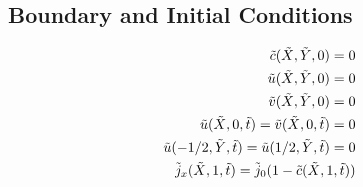 \documentclass[../main.tex]{subfiles}
\begin{document}
\subsection{Boundary and Initial Conditions}
\begin{center}
    \begin{align}
        \tilde{c}(\tilde{X}, \tilde{Y}, 0) = 0 \\
        \tilde{u}(\tilde{X}, \tilde{Y}, 0) = 0 \\
        \tilde{v}(\tilde{X}, \tilde{Y}, 0) = 0 \\
        \tilde{u}(\tilde{X}, 0, \tilde{t}) = \tilde{v}(\tilde{X}, 0, \tilde{t}) = 0 \\
        \tilde{u}(-1/2, \tilde{Y}, \tilde{t}) =  \tilde{u}(1/2, \tilde{Y}, \tilde{t}) = 0 \\
        \tilde{j}_x(\tilde{X}, 1, \tilde{t}) = \tilde{j}_0 (1 - \tilde{c}(\tilde{X}, 1, \tilde{t}))
     \end{align}     
\end{center}
\end{document}
